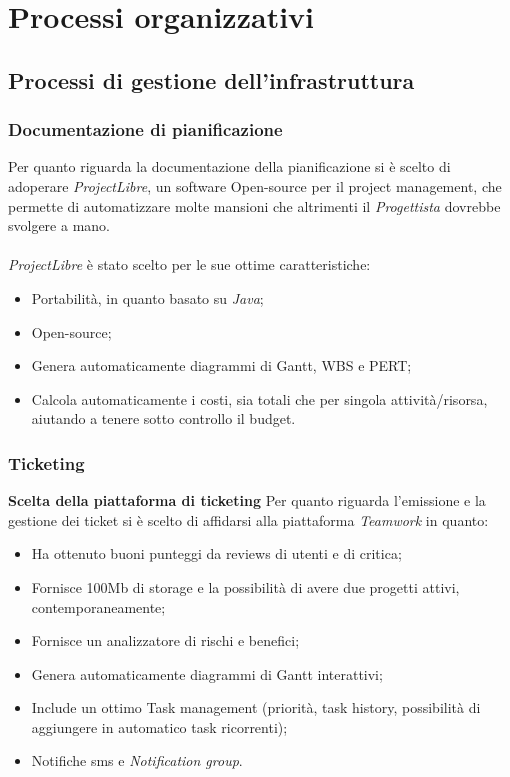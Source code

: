 \documentclass[a4paper]{article}
\begin{document}
	\section{Processi organizzativi}
	\subsection{Processi di gestione dell'infrastruttura}
	\subsubsection{Documentazione di pianificazione}
		Per quanto riguarda la documentazione della pianificazione si è scelto di adoperare
		\emph{ProjectLibre}, un software Open-source per il project management, che permette
		di automatizzare molte mansioni che altrimenti il \emph{Progettista} dovrebbe svolgere
		a mano. \\ \\
		\emph{ProjectLibre} è stato scelto per le sue ottime caratteristiche:
		\begin{itemize}
			\item Portabilità, in quanto basato su \emph{Java};
			\item Open-source;
			\item Genera automaticamente diagrammi di Gantt, WBS e PERT;
			\item Calcola automaticamente i costi, sia totali che per singola attività/risorsa,
			aiutando a tenere sotto controllo il budget.
		\end{itemize}
	\subsubsection{Ticketing}
	\textbf{Scelta della piattaforma di ticketing}
	Per quanto riguarda l'emissione e la gestione dei ticket si è scelto di affidarsi alla piattaforma \emph{Teamwork}
	in quanto:
	\begin{itemize}
		\item Ha ottenuto buoni punteggi da reviews di utenti e di critica;
		\item Fornisce 100Mb di storage e la possibilità di avere due progetti attivi, contemporaneamente;
		\item Fornisce un analizzatore di rischi e benefici;
		\item Genera automaticamente diagrammi di Gantt interattivi;
		\item Include un ottimo Task management (priorità, task history, possibilità di aggiungere in automatico task ricorrenti);
		\item Notifiche sms e \emph{Notification group}.
	\end{itemize}
\end{document}
